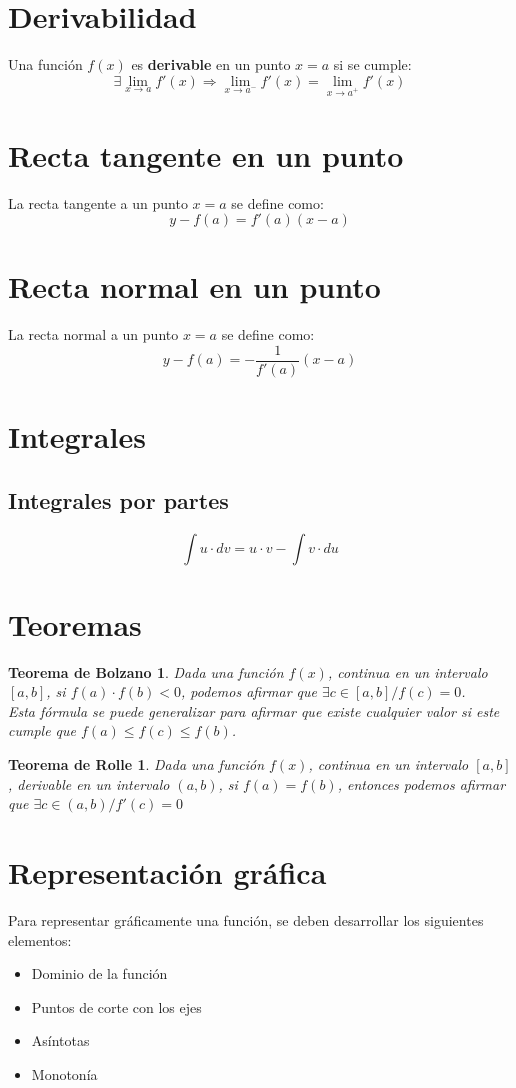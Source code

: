 \documentclass{article}
\theoremstyle{plain}
\newtheorem*{bolzano*}{Teorema de Bolzano}
\newtheorem*{rolle*}{Teorema de Rolle}
\begin{document}
\section*{Derivabilidad}
Una función $f(x)$ es \textbf{derivable} en un punto $x=a$ si se cumple:
\[
    \exists \lim_{x \to a} f'(x) \Rightarrow \lim_{x \to a^-} f'(x) = \lim_{x \to a^+} f'(x)
\]

\section*{Recta tangente en un punto}
La recta tangente a un punto $x=a$ se define como:
\[
    y-f(a)=f'(a)(x-a)
\]

\section*{Recta normal en un punto}
La recta normal a un punto $x=a$ se define como:
\[
    y-f(a)=- \frac{1}{f'(a)}(x-a)
\] 
\section*{Integrales}
\subsection*{Integrales por partes}
\[
    \int u\cdot dv = u\cdot v-\int v\cdot du
\]
\pagebreak

\section*{Teoremas}

\begin{bolzano*}
    Dada una función $f(x)$, continua en un intervalo $[a,b]$, si $f(a)\cdot f(b)<0$,
    podemos afirmar que $\exists c \in [a,b] / f(c)=0$.\\
    Esta fórmula se puede generalizar para afirmar que existe cualquier valor si este cumple
    que $f(a)\leq f(c)\leq f(b)$. 
\end{bolzano*}

\begin{rolle*}
    Dada una función $f(x)$, continua en un intervalo $[a,b]$, derivable en un intervalo
    $(a,b)$, si $f(a)=f(b)$, entonces podemos afirmar que $\exists c \in (a,b)/f'(c)=0$ 
\end{rolle*}

\section*{Representación gráfica}
Para representar gráficamente una función, se deben desarrollar los siguientes elementos:
\begin{itemize}
    \item Dominio de la función
    \item Puntos de corte con los ejes
    \item Asíntotas
    \item Monotonía
\end{itemize}
\pagebreak
\end{document}
